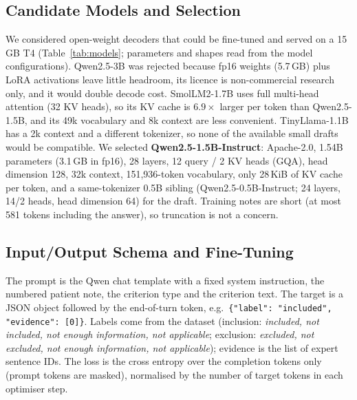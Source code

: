 \documentclass[conference]{IEEEtran}
\begin{document}
\subsection{Candidate Models and Selection}
We considered open-weight decoders that could be fine-tuned and served on a 15\,GB T4 (Table~\ref{tab:models}; parameters and shapes read from the model configurations). Qwen2.5-3B was rejected because fp16 weights (5.7\,GB) plus LoRA activations leave little headroom, its licence is non-commercial research only, and it would double decode cost. SmolLM2-1.7B uses full multi-head attention (32 KV heads), so its KV cache is $6.9\times$ larger per token than Qwen2.5-1.5B, and its 49k vocabulary and 8k context are less convenient. TinyLlama-1.1B has a 2k context and a different tokenizer, so none of the available small drafts would be compatible. We selected \textbf{Qwen2.5-1.5B-Instruct}: Apache-2.0, 1.54B parameters (3.1\,GB in fp16), 28 layers, 12 query / 2 KV heads (GQA), head dimension 128, 32k context, 151,936-token vocabulary, only 28\,KiB of KV cache per token, and a same-tokenizer 0.5B sibling (Qwen2.5-0.5B-Instruct; 24 layers, 14/2 heads, head dimension 64) for the draft. Training notes are short (at most 581 tokens including the answer), so truncation is not a concern.

\begin{table}[t]
\caption{Candidate decoders (from model configs). KV B/tok = fp16 cache bytes per token.}
\label{tab:models}
\centering\scriptsize
\resizebox{\columnwidth}{!}{}
\end{table}

\subsection{Input/Output Schema and Fine-Tuning}
The prompt is the Qwen chat template with a fixed system instruction, the numbered patient note, the criterion type and the criterion text. The target is a JSON object followed by the end-of-turn token, e.g.\ \texttt{\{"label": "included", "evidence": [0]\}}. Labels come from the dataset (inclusion: \emph{included, not included, not enough information, not applicable}; exclusion: \emph{excluded, not excluded, not enough information, not applicable}); evidence is the list of expert sentence IDs. The loss is the cross entropy over the completion tokens only (prompt tokens are masked), normalised by the number of target tokens in each optimiser step.
\end{document}
